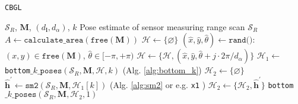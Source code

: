 \begin{algorithm}[]
  \caption{\texttt{CBGL}}
  \begin{spacing}{1.2}
  \begin{algorithmic}[1]
    \REQUIRE $\mathcal{S}_R$, $\bm{M}$, $(d_{\bm{l}}, d_\alpha)$, $k$
    \ENSURE Pose estimate of sensor measuring range scan $\mathcal{S}_R$ %
    \STATE $A \leftarrow \texttt{calculate\_area}(\texttt{free}(\bm{M}))$
    \STATE $\mathcal{H} \leftarrow \{\varnothing\}$
      \STATE \small $(\hat{x},\hat{y},\hat{\theta}) \leftarrow \texttt{rand()}$: $(x,y) \in \texttt{free}(\bm{M})$, $\hat{\theta} \in [-\pi,+\pi)$
        \STATE $\mathcal{H} \leftarrow \{\mathcal{H}, (\hat{x}, \hat{y}, \hat{\theta} + j \cdot 2\pi / d_{\alpha})\}$     \label{alg:cbgl:h}
      \ENDFOR
    \ENDFOR
    \STATE $\mathcal{H}_1 \leftarrow$ \texttt{bottom}$\_k\_\texttt{poses}(\mathcal{S}_R, \bm{M}, \mathcal{H}, k)$ \hfill {\small (Alg. \ref{alg:bottom_k}}) \label{alg:cbgl:h1}
    \STATE $\mathcal{H}_2 \leftarrow \{\varnothing \}$
      \STATE $\hat{\bm{h}}^\prime \leftarrow \texttt{sm2}(\mathcal{S}_R, \bm{M}, \mathcal{H}_1[k])$ \hfill {\small (Alg. \ref{alg:sm2} or e.g. \texttt{x1} \cite{Filotheou2023a}})
      \STATE $\mathcal{H}_2 \leftarrow \{\mathcal{H}_2, \hat{\bm{h}}^\prime\}$  \label{alg:cbgl:h2}
    \ENDFOR
    \RETURN \texttt{bottom}$\_k\_\texttt{poses}(\mathcal{S}_R, \bm{M}, \mathcal{H}_2, 1)$
  \end{algorithmic}
  \end{spacing}
  \label{alg:cbgl}
\end{algorithm}

